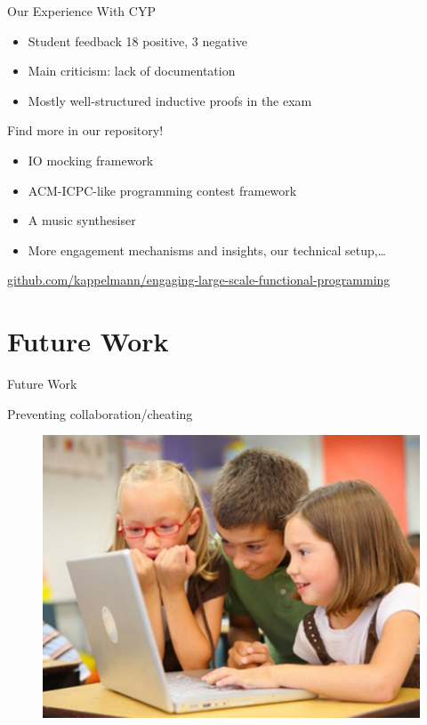 \documentclass{beamer}
\begin{document}
\begin{frame}{Our Experience With CYP}
\begin{itemize}[<+->]
  \item Student feedback 18 positive, 3 negative
  \item Main criticism: lack of documentation
  \item Mostly well-structured inductive proofs in the exam
\end{itemize}
\end{frame}


\begin{frame}
\centerline{\alert{\huge{Find more in our repository!}}}
\begin{itemize}
\item IO mocking framework
\item ACM-ICPC-like programming contest framework
\item A music synthesiser
\item More engagement mechanisms and insights, our technical setup,\dots
\end{itemize}

\vspace{\baselineskip}
\centerline{\small\url{github.com/kappelmann/engaging-large-scale-functional-programming}}
\end{frame}



\section{Future Work}

\begin{frame}{Future Work}
\centerline{Preventing collaboration/cheating}
\begin{figure}
\includegraphics[width=0.85\linewidth]{assets/group}
\end{figure}
\end{frame}
\end{document}
